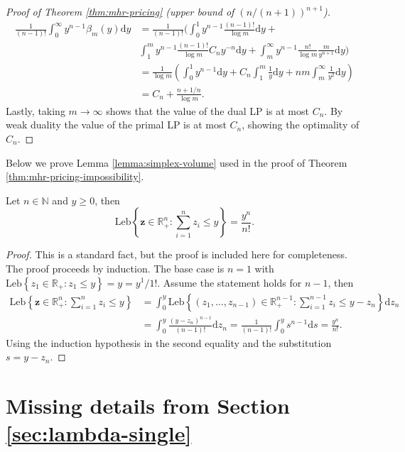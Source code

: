\documentclass[11pt]{article}
\newcommand{\dd}{\mathrm{d}}
\begin{document}
\begin{proof}[Proof of Theorem \ref{thm:mhr-pricing} (upper bound of $(n/(n+1))^{n+1}$)]
\begin{align*}
        \frac{1}{(n-1)
        !}\int_0^\infty y^{n-1}\beta_m(y)\dd y&=\frac{1}{(n-1)!}\Bigg(\int_0^1y^{n-1}\frac{(n-1)!}{\log m}\dd y+\\& \int_1^my^{n-1}\frac{(n-1)!}{\log m}C_ny^{-n}\dd y+\int_m^\infty y^{n-1}\frac{n!}{\log m}\frac{m}{y^{n+1}}\dd y\Bigg)\\
        &=\frac{1}{\log m}\left(\int_0^1y^{n-1}\dd y+C_n\int_1^m\frac{1}{y}\dd y+nm\int_m^\infty\frac{1}{y^2}\dd y\right)\\
        &=C_n+\frac{n+1/n}{\log m}.    
    \end{align*}
    Lastly, taking $m\to\infty$ shows that the value of the dual LP is at most $C_n$. By weak duality the value of the primal LP is at most $C_n$, showing the optimality of $C_n$.
\end{proof}

Below we prove Lemma \ref{lemma:simplex-volume} used in the proof of Theorem \ref{thm:mhr-pricing-impossibility}.

\begin{lemma}\label{lemma:simplex-volume}
    Let $n\in\mathbb{N}$ and $y\ge 0$, then
    $$
        \mathrm{Leb}\left\{\boldsymbol{z}\in\mathbb{R}_+^n:\sum_{i=1}^nz_i\le y\right\}=\frac{y^n}{n!}.
    $$
\end{lemma}
\begin{proof}
    This is a standard fact, but the proof is included here for completeness. The proof proceeds by induction. The base case is $n=1$ with $\mathrm{Leb}\left\{z_1\in\mathbb{R}_+:z_1\le y\right\}=y=y^1/1!$. Assume the statement holds for $n-1$, then
    \begin{align*}
        \mathrm{Leb}\left\{\boldsymbol{z}\in\mathbb{R}_+^n:\sum_{i=1}^nz_i\le y\right\}&=\int_0^y
        \mathrm{Leb}\left\{(z_1,\dots,z_{n-1})\in\mathbb{R}_+^{n-1}:\sum_{i=1}^{n-1}z_i\le y-z_n\right\}\dd z_n\\
        &=\int_0^y\frac{(y-z_n)^{n-1}}{(n-1)!}\dd z_n=\frac{1}{(n-1)!}\int_0^ys^{n-1}\dd s=\frac{y^n}{n!}.
    \end{align*}
    Using the induction hypothesis in the second equality and the substitution $s=y-z_n$.
\end{proof}

\newpage


\section{Missing details from Section \ref{sec:lambda-single}}
\end{document}
